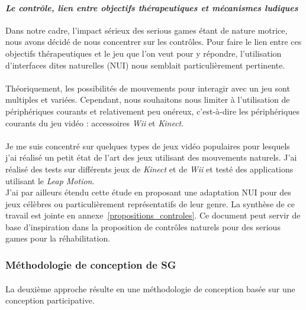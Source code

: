 			\paragraph{\emph{Le contrôle, lien entre objectifs thérapeutiques et mécanismes ludiques}\\}
Dans notre cadre, l'impact sérieux des serious games étant de nature motrice, nous avons décidé de nous concentrer sur les contrôles. Pour faire le lien entre ces objectifs thérapeutiques et le jeu que l’on veut pour y répondre, l’utilisation d’interfaces dites naturelles (NUI) nous semblait particulièrement pertinente. 

\paragraph{} 
Théoriquement, les possibilités de mouvements pour interagir avec un jeu sont multiples et variées. Cependant, nous souhaitons nous limiter à l'utilisation de périphériques courants et relativement peu onéreux, c'est-à-dire les périphériques courants du jeu vidéo : accessoires \emph{Wii} et \emph{Kinect}.

\paragraph{} Je me suis concentré sur quelques types de jeux vidéo populaires pour lesquels j'ai réalisé un petit état de l'art des jeux utilisant des mouvements naturels. J'ai réalisé des tests sur différents jeux de \emph{Kinect} et de \emph{Wii} et testé des applications utilisant le \emph{Leap Motion}. \\J'ai par ailleurs étendu cette étude en proposant une adaptation NUI pour des jeux célèbres ou particulièrement représentatifs de leur genre.
La synthèse de ce travail est jointe en annexe~\ref{propositions_controles}. Ce document peut servir de base d'inspiration dans la proposition de contrôles naturels pour des serious games pour la réhabilitation.

	
	\subsubsection{Méthodologie de conception de SG}
	\paragraph{}
La deuxième approche résulte en une méthodologie de conception basée sur une conception participative. 

